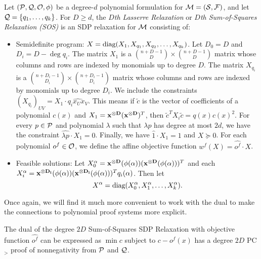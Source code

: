 \begin{definition}
Let $(\mathcal P, \mathcal Q, \mathcal O, \phi)$ be a degree-$d$ polynomial formulation for $\mathcal M = (\mathcal S, \mathcal F)$, and let $\mathcal Q = \{q_1, \dots, q_k\}$. For $D \geq d$, the \emph{$D$th Lasserre Relaxation} or \emph{$D$th Sum-of-Squares Relaxation (SOS)} is an SDP relaxation for $\mathcal M$ consisting of:
\begin{itemize}
    \item {} Semidefinite program: $X = \text{diag}(X_1, X_{q_1}, X_{q_2}, \dots, X_{q_k})$. Let $D_0 = D$ and $D_i = D - \deg q_i$. The matrix $X_1$ is a $\binom{n+D-1}{D} \times \binom{n+D-1}{D}$ matrix whose columns and rows are indexed by monomials up to degree $D$. The matrix $X_{q_i}$ is a $\binom{n+D_i - 1}{D_i} \times \binom{n+D_i - 1}{D_i}$ matrix whose columns and rows are indexed by monomials up to degree $D_i$. We include the constraints $(X_{q_i})_{UV} = X_1 \cdot \widehat{q_ix_Ux_V}$. This means if $\tilde{c}$ is the vector of coefficients of a polynomial $c(x)$ and $X_1 = \mathbf{x^{\otimes D}}(\mathbf{x^{\otimes D}})^T$, then $\tilde{c}^TX_i\tilde{c} = q(x)c(x)^2$. For every $p \in \mathcal P$ and polynomial $\lambda$ such that $\lambda p$ has degree at most $2d$, we have the constraint $\widehat{\lambda p} \cdot X_1 = 0$. Finally, we have $\widehat{1} \cdot X_1 = 1$ and $X \succeq 0$. For each polynomial $o^f \in \mathcal O$, we define the affine objective function $w^f(X) = \widehat{o^f} \cdot X$.
    \item Feasible solutions:  Let $X_0^\alpha = \mathbf{x^{\otimes D}}(\phi(\alpha))(\mathbf{x^{\otimes D}}(\phi(\alpha)))^T$ and each \\ $X_i^\alpha = \mathbf{x^{\otimes D_i}}(\phi(\alpha))(\mathbf{x^{\otimes D_i}}(\phi(\alpha)))^Tq_i(\alpha)$. Then let
\[X^\alpha = \text{diag}(X_0^\alpha, X_1^\alpha,\dots,X_k^\alpha).\]
\end{itemize}
\end{definition}
Once again, we will find it much more convenient to work with the dual to make the connections to polynomial proof systems more explicit.
\begin{lemma}
The dual of the degree $2D$ Sum-of-Squares SDP Relaxation with objective function $\widehat{o^f}$ can be expressed as  $\min c$ subject to $c - o^f(x)$ has a degree $2D$ PC$_>$ proof of nonnegativity from $\mathcal P$ and $\mathcal Q$.
\end{lemma}
